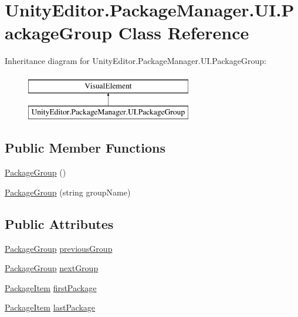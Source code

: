 \hypertarget{class_unity_editor_1_1_package_manager_1_1_u_i_1_1_package_group}{}\section{Unity\+Editor.\+Package\+Manager.\+U\+I.\+Package\+Group Class Reference}
\label{class_unity_editor_1_1_package_manager_1_1_u_i_1_1_package_group}
Inheritance diagram for Unity\+Editor.\+Package\+Manager.\+U\+I.\+Package\+Group\+:\begin{figure}[H]
\begin{center}
\leavevmode
\includegraphics[height=2.000000cm]{class_unity_editor_1_1_package_manager_1_1_u_i_1_1_package_group}
\end{center}
\end{figure}
\subsection*{Public Member Functions}
\begin{DoxyCompactItemize}
\item 
\mbox{\hyperlink{class_unity_editor_1_1_package_manager_1_1_u_i_1_1_package_group_a3940dfe9681ca82a6c357becf6d8718f}{Package\+Group}} ()
\item 
\mbox{\hyperlink{class_unity_editor_1_1_package_manager_1_1_u_i_1_1_package_group_a84e44c2d92af75a10b1be79c806ca55a}{Package\+Group}} (string group\+Name)
\end{DoxyCompactItemize}
\subsection*{Public Attributes}
\begin{DoxyCompactItemize}
\item 
\mbox{\hyperlink{class_unity_editor_1_1_package_manager_1_1_u_i_1_1_package_group}{Package\+Group}} \mbox{\hyperlink{class_unity_editor_1_1_package_manager_1_1_u_i_1_1_package_group_a17673340659d03fe29324de988ebc2d6}{previous\+Group}}
\item 
\mbox{\hyperlink{class_unity_editor_1_1_package_manager_1_1_u_i_1_1_package_group}{Package\+Group}} \mbox{\hyperlink{class_unity_editor_1_1_package_manager_1_1_u_i_1_1_package_group_ad4211356a171a288c8c831b10c68510d}{next\+Group}}
\item 
\mbox{\hyperlink{class_unity_editor_1_1_package_manager_1_1_u_i_1_1_package_item}{Package\+Item}} \mbox{\hyperlink{class_unity_editor_1_1_package_manager_1_1_u_i_1_1_package_group_a24d18090b8f460302bcf5353f6d62b58}{first\+Package}}
\item 
\mbox{\hyperlink{class_unity_editor_1_1_package_manager_1_1_u_i_1_1_package_item}{Package\+Item}} \mbox{\hyperlink{class_unity_editor_1_1_package_manager_1_1_u_i_1_1_package_group_a15e617e368bf709ff93c9ff26e9d093a}{last\+Package}}
\end{DoxyCompactItemize}


